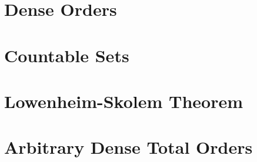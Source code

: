 \documentclass{article}
\begin{document}
\section{Dense Orders}

\section{Countable Sets}

\section{Lowenheim-Skolem Theorem}

\section{Arbitrary Dense Total Orders}
\end{document}
